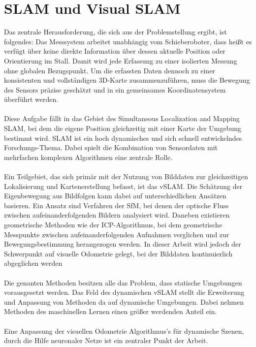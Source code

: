 \documentclass[12pt,DIV=15,BCOR=15mm,twoside,headsepline,abstract=true,listof=totoc,bibliography=totoc]{scrreprt}
\theoremstyle{remark}    %
\begin{document}
    \section{SLAM und Visual SLAM}
    Das zentrale Herausforderung, die sich aus der Problemstellung ergibt, ist folgendes:
    Das Messsystem arbeitet unabhängig vom Schieberoboter, dass heißt es verfügt über keine direkte Information über dessen aktuelle Position oder Orientierung im Stall.
    Damit wird jede Erfassung zu einer isolierten Messung ohne globalen Bezugspunkt.
    Um die erfassten Daten dennoch zu einer konsistenten und vollständigen 3D-Karte zusammenzuführen, muss die Bewegung des Sensors präzise geschätzt und in ein gemeinsames 
    Koordinatensystem überführt werden.\\\\
    Diese Aufgabe fällt in das Gebiet des Simultaneous Localization and Mapping \ac{SLAM}, bei dem die eigene Position gleichzeitig mit einer Karte der Umgebung 
    bestimmt wird. \ac{SLAM} ist ein hoch dynamisches und sich schnell entwickelndes Forschungs-Thema. Dabei spielt die Kombination von Sensordaten mit mehrfachen
    komplexen Algorithmen eine zentrale Rolle.\\\\
    Ein Teilgebiet, das sich primär mit der Nutzung von Bilddaten zur gleichzeitigen Lokalisierung und Kartenerstellung befasst, ist das \ac{vSLAM}.
    Die Schätzung der Eigenbewegung aus Bildfolgen kann dabei auf unterschiedlichen Ansätzen basieren.
    Ein Ansatz sind Verfahren der \ac{SfM}, bei denen der optische Fluss zwischen aufeinanderfolgenden Bildern analysiert wird.
    Daneben existieren geometrische Methoden wie der \ac{ICP}-Algorithmus, bei dem geometrische Messpunkte zwischen aufeinanderfolgenden Aufnahmen verglichen 
    und zur Bewegungsbestimmung herangezogen werden.
    In dieser Arbeit wird jedoch der Schwerpunkt auf visuelle Odometrie gelegt, bei der Bilddaten kontinuierlich abgeglichen werden \cite{10577209}\\\\
    Die genanten Methoden besitzen alle das Problem, dass statische Umgebungen vorausgesetzt werden. Das Feld des dynamischen \ac{vSLAM} stellt die Erweiterung 
    und Anpassung von Methoden da auf dynamische Umgebungen. Dabei nehmen Methoden des maschinellen Lernen einen größer werdenden Anteil ein.\cite{10577209}\\\\
    Eine Anpassung der visuellen Odometrie Algorithmus's für dynamische Szenen, durch die Hilfe neuronaler Netze ist ein zentraler Punkt der Arbeit.\\\\
\end{document}
